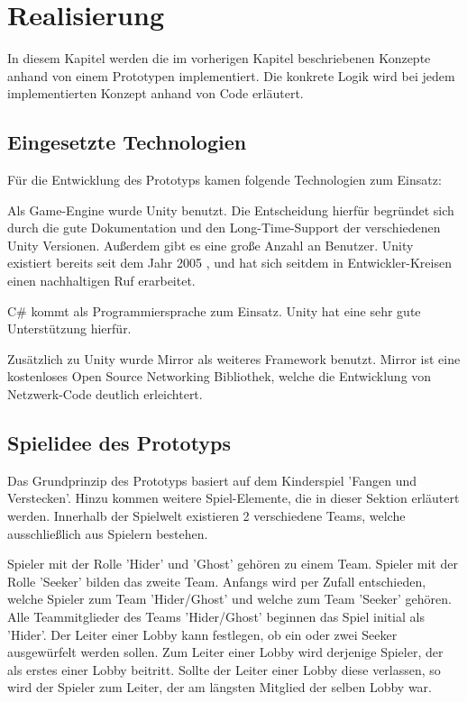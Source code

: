 \chapter{Realisierung}
\label{sec:realisierung}

In diesem Kapitel werden die im vorherigen Kapitel beschriebenen Konzepte anhand von einem Prototypen implementiert. Die konkrete Logik wird bei jedem implementierten Konzept anhand von Code erläutert.

\section{Eingesetzte Technologien}

Für die Entwicklung des Prototyps kamen folgende Technologien zum Einsatz:

Als Game-Engine wurde Unity \cite{Technologies.03.02.2022} benutzt. Die Entscheidung hierfür begründet sich durch die gute Dokumentation und den Long-Time-Support der verschiedenen Unity Versionen. Außerdem gibt es eine große Anzahl an Benutzer. Unity existiert bereits seit dem Jahr 2005 \cite{Wikipedia.2022c}, und hat sich seitdem in Entwickler-Kreisen einen nachhaltigen Ruf erarbeitet.

C\# kommt als Programmiersprache zum Einsatz. Unity hat eine sehr gute Unterstützung hierfür.

Zusätzlich zu Unity wurde Mirror\cite{.03.02.2022} als weiteres Framework benutzt. Mirror ist eine kostenloses Open Source Networking Bibliothek, welche die Entwicklung von Netzwerk-Code deutlich erleichtert.

\section{Spielidee des Prototyps}
\label{Spielidee}

Das Grundprinzip des Prototyps basiert auf dem Kinderspiel 'Fangen und Verstecken'. Hinzu kommen weitere Spiel-Elemente, die in dieser Sektion erläutert werden. Innerhalb der Spielwelt existieren 2 verschiedene Teams, welche ausschließlich aus Spielern bestehen.

Spieler mit der Rolle 'Hider' und 'Ghost' gehören zu einem Team.  Spieler mit der Rolle 'Seeker' bilden das zweite Team. Anfangs wird per Zufall entschieden, welche Spieler zum Team 'Hider/Ghost' und welche zum Team 'Seeker' gehören. Alle Teammitglieder des Teams 'Hider/Ghost' beginnen das Spiel initial als 'Hider'. Der Leiter einer Lobby kann festlegen, ob ein oder zwei Seeker ausgewürfelt werden sollen. Zum Leiter einer Lobby wird derjenige Spieler, der als erstes einer Lobby beitritt. Sollte der Leiter einer Lobby diese verlassen, so wird der Spieler zum Leiter, der am längsten Mitglied der selben Lobby war.

